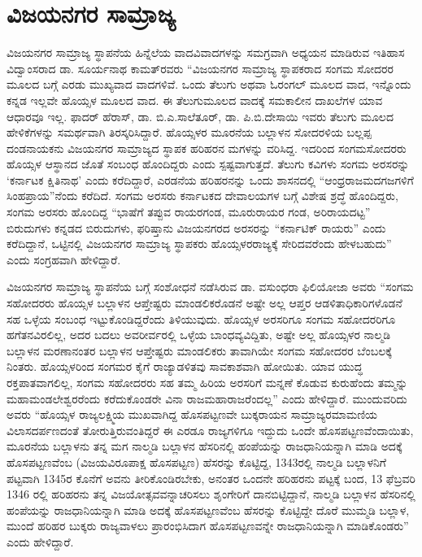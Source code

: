 \section{ವಿಜಯನಗರ ಸಾಮ್ರಾಜ್ಯ}

\vskip -6pt

ವಿಜಯನಗರ ಸಾಮ್ರಾಜ್ಯ ಸ್ಥಾಪನೆಯ ಹಿನ್ನೆಲೆಯ ವಾದವಿವಾದಗಳನ್ನು ಸಮಗ್ರವಾಗಿ ಅಧ್ಯಯನ ಮಾಡಿರುವ ಇತಿಹಾಸ ವಿದ್ವಾಂಸರಾದ ಡಾ. ಸೂರ್ಯನಾಥ ಕಾಮತ್​ರವರು “ವಿಜಯನಗರ ಸಾಮ್ರಾಜ್ಯ ಸ್ಥಾಪಕರಾದ ಸಂಗಮ ಸೋದರರ ಮೂಲದ ಬಗ್ಗೆ ಎರಡು ಮುಖ್ಯವಾದ ವಾದಗಳಿವೆ. ಒಂದು ತೆಲುಗು ಅಥವಾ ಓರಂಗಲ್​ ಮೂಲದ ವಾದ, ಇನ್ನೊಂದು ಕನ್ನಡ ಇಲ್ಲವೇ ಹೊಯ್ಸಳ ಮೂಲದ ವಾದ. ಈ ತೆಲುಗುಮೂಲದ ವಾದಕ್ಕೆ ಸಮಕಾಲೀನ ದಾಖಲೆಗಳ ಯಾವ ಆಧಾರವೂ ಇಲ್ಲ. ಫಾದರ್​ ಹೆರಾಸ್​, ಡಾ. ಬಿ.ಎ.ಸಾಲೆತೂರ್​, ಡಾ. ಪಿ.ಬಿ.ದೇಸಾಯಿ ಇವರು ತೆಲುಗು ಮೂಲದ ಹೇಳಿಕೆಗಳನ್ನು ಸಮರ್ಥವಾಗಿ ತಿರಸ್ಕರಿಸಿದ್ದಾರೆ. ಹೊಯ್ಸಳರ ಮೂರನೆಯ ಬಲ್ಲಾಳನ ಸೋದರಳಿಯ ಬಲ್ಲಪ್ಪ ದಂಡನಾಯಕನು ವಿಜಯನಗರ ಸಾಮ್ರಾಜ್ಯದ ಸ್ಥಾಪಕ ಹರಿಹರನ ಮಗಳನ್ನು ವರಿಸಿದ್ದ. ಇದರಿಂದ ಸಂಗಮಸೋದರರು ಹೊಯ್ಸಳ ಆಸ್ಥಾನದ ಜೊತೆ ಸಂಬಂಧ ಹೊಂದಿದ್ದರು ಎಂದು ಸ್ಪಷ್ಟವಾಗುತ್ತದೆ. ತೆಲುಗು ಕವಿಗಳು ಸಂಗಮ ಅರಸರನ್ನು ‘ಕರ್ನಾಟಕ ಕ್ಷಿತಿನಾಥ’ ಎಂದು ಕರೆದಿದ್ದಾರೆ, ಎರಡನೆಯ ಹರಿಹರನನ್ನು ಒಂದು ಶಾಸನದಲ್ಲಿ “ಆಂಧ್ರರಾಜಮದಗಜಗಳಿಗೆ ಸಿಂಹಪ್ರಾಯ”ನೆಂದು ಕರೆದಿದೆ. ಸಂಗಮ ಅರಸರು ಕರ್ನಾಟಕದ ದೇವಾಲಯಗಳ ಬಗ್ಗೆ ವಿಶೇಷ ಶ್ರದ್ಧೆ ಹೊಂದಿದ್ದರು, ಸಂಗಮ ಅರಸರು ಹೊಂದಿದ್ದ “ಭಾಷೆಗೆ ತಪ್ಪುವ ರಾಯರಗಂಡ, ಮೂರುರಾಯರ ಗಂಡ, ಅರಿರಾಯದಟ್ಟ” ಬಿರುದುಗಳು ಕನ್ನಡದ ಬಿರುದುಗಳು, ಫರಿಷ್ತಾನು ವಿಜಯನಗರದ ಅರಸರನ್ನು “ಕರ್ನಾಟಿಕ್​ ರಾಯರು” ಎಂದು ಕರೆದಿದ್ದಾನೆ, ಒಟ್ಟಿನಲ್ಲಿ ವಿಜಯನಗರ ಸಾಮ್ರಾಜ್ಯ ಸ್ಥಾಪಕರು ಹೊಯ್ಸಳರರಾಜ್ಯಕ್ಕೆ ಸೇರಿದವರೆಂದು ಹೇಳಬಹುದು” ಎಂದು ಸಂಗ್ರಹವಾಗಿ ಹೇಳಿದ್ದಾರೆ. 

ವಿಜಯನಗರ ಸಾಮ್ರಾಜ್ಯ ಸ್ಥಾಪನೆಯ ಬಗ್ಗೆ ಸಂಶೋಧನೆ ನಡೆಸಿರುವ ಡಾ. ವಸುಂಧರಾ ಫಿಲಿಯೋಜಾ ಅವರು “ಸಂಗಮ ಸಹೋದರರು ಹೊಯ್ಸಳ ಬಲ್ಲಾಳನ ಆಪ್ತೇಷ್ಟರು ಮಾಂಡಲಿಕರೊಡನೆ ಅಷ್ಟೇ ಅಲ್ಲ ಆಪ್ತರ ಆಡಳಿತಾಧಿಕಾರಿಗಳೊಡನೆ ಸಹ ಒಳ್ಳೆಯ ಸಂಬಂಧ ಇಟ್ಟುಕೊಂಡಿದ್ದರೆಂದು ತಿಳಿಯುವುದು. ಹೊಯ್ಸಳ ಅರಸರಿಗೂ ಸಂಗಮ ಸಹೋದರರಿಗೂ ಹಗೆತನವಿರಲಿಲ್ಲ, ಅದರ ಬದಲು ಅವರೀರ್ವರಲ್ಲಿ ಒಳ್ಳೆಯ ಬಾಂಧವ್ಯವಿದ್ದಿತು, ಅಷ್ಟೇ ಅಲ್ಲ ಹೊಯ್ಸಳರ ನಾಲ್ಮಡಿ ಬಲ್ಲಾಳನ ಮರಣಾನಂತರ ಬಲ್ಲಾಳನ ಆಪ್ತೇಷ್ಟರು ಮಾಂಡಲಿಕರು ತಾವಾಗಿಯೇ ಸಂಗಮ ಸಹೋದರರ ಬೆಂಬಲಕ್ಕೆ ನಿಂತರು. ಹೊಯ್ಸಳರಿಂದ ಸಂಗಮರ ಕೈಗೆ ರಾಜ್ಯಾಡಳಿತವು ಸಾವಕಾಶವಾಗಿ ಹೋಯಿತು. ಯಾವ ಯುದ್ಧ ರಕ್ತಪಾತವಾಗಲಿಲ್ಲ, ಸಂಗಮ ಸಹೋದರರು ಸಹ ತಮ್ಮ ಹಿರಿಯ ಅರಸರಿಗೆ ಮನ್ನಣೆ ಕೊಡುವ ಕುರುಹೆಂದು ತಮ್ಮನ್ನು ಮಹಾಮಂಡಲೇಶ್ವರರೆಂದು ಕರೆದುಕೊಂಡರೇ ವಿನಾ ರಾಜಮಹಾರಾಜರೆಂದಲ್ಲ” ಎಂದು ಹೇಳಿದ್ದಾರೆ. ಮುಂದುವರಿದು ಅವರು “ಹೊಯ್ಸಳ ರಾಜ್ಯಲಕ್ಷ್ಮಿಯ ಮುಖವಾಗಿದ್ದ ಹೊಸಪಟ್ಟಣವೇ ಬುಕ್ಕರಾಯನ ಸಾಮ್ರಾಜ್ಯರಮಾಮಣಿಯ ವಿಲಾಸದರ್ಪಣದಂತೆ ತೋರುತ್ತಿರುವಂತಿದ್ದರೆ ಈ ಎರಡೂ ರಾಜ್ಯಗಳಿಗೂ ಇದ್ದುದು ಒಂದೇ ಹೊಸಪಟ್ಟಣವೆಂದಾಯಿತು, ಮೂರನೆಯ ಬಲ್ಲಾಳನು ತನ್ನ ಮಗ ನಾಲ್ಮಡಿ ಬಲ್ಲಾಳನ ಹೆಸರಿನಲ್ಲಿ ಹಂಪೆಯನ್ನು ರಾಜಧಾನಿಯನ್ನಾಗಿ ಮಾಡಿ ಅದಕ್ಕೆ ಹೊಸಪಟ್ಟಣವೆಂಬ (ವಿಜಯವಿರೂಪಾಕ್ಷ ಹೊಸಪಟ್ಟಣ) ಹೆಸರನ್ನು ಕೊಟ್ಟಿದ್ದ, 1343ರಲ್ಲಿ ನಾಲ್ಮಡಿ ಬಲ್ಲಾಳನಿಗೆ ಪಟ್ಟವಾಗಿ 1345ರ ಕೊನೆಗೆ ಅವನು ತೀರಿಕೊಂಡಿರಬೇಕು, ಅನಂತರ ಒಂದನೇ ಹರಿಹರನು ಪಟ್ಟಕ್ಕೆ ಬಂದ, 13 ಫೆಬ್ರವರಿ 1346 ರಲ್ಲಿ ಹರಿಹರನು ತನ್ನ ವಿಜಯೋತ್ಸವವನ್ನಾಚರಿಸಲು ಶೃಂಗೇರಿಗೆ ದಾನಬಿಟ್ಟಿದ್ದಾನೆ, ನಾಲ್ಮಡಿ ಬಲ್ಲಾಳನ ಹೆಸರಿನಲ್ಲಿ ಹಂಪೆಯನ್ನು ರಾಜಧಾನಿಯನ್ನಾಗಿ ಮಾಡಿ ಅದಕ್ಕೆ ಹೊಸಪಟ್ಟಣವೆಂಬ ಹೆಸರನ್ನು ಕೊಟ್ಟಿದ್ದೇ ದೊರೆ ಮುಮ್ಮಡಿ ಬಲ್ಲಾಳ, ಮುಂದೆ ಹರಿಹರ ಬುಕ್ಕರು ರಾಜ್ಯವಾಳಲು ಪ್ರಾರಂಭಿಸಿದಾಗ ಹೊಸಪಟ್ಟಣವನ್ನೇ ರಾಜಧಾನಿಯನ್ನಾಗಿ ಮಾಡಿಕೊಂಡರು” ಎಂದು ಹೇಳಿದ್ದಾರೆ.

